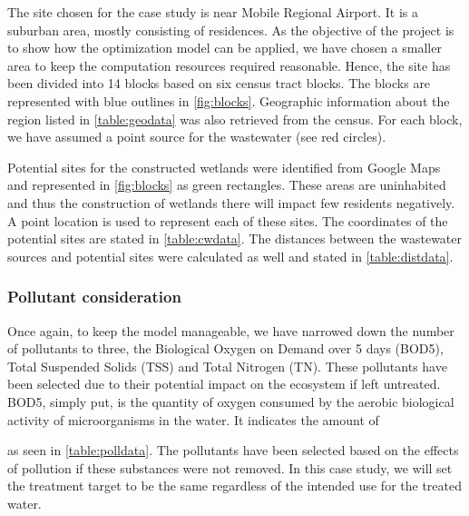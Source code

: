 \documentclass[preprint,12pt,authoryear]{elsarticle}
\begin{document}
The site chosen for the case study is near Mobile Regional Airport. It is a suburban area, mostly consisting of residences. As the objective of the project is to show how the optimization model can be applied, we have chosen a smaller area to keep the computation resources required reasonable. Hence, the site has been divided into 14 blocks based on six census tract blocks. The blocks are represented with blue outlines in \autoref{fig:blocks}. Geographic information about the region listed in \autoref{table:geodata} was also retrieved from the census. \citep{acs2015} For each block, we have assumed a point source for the wastewater (see red circles).

Potential sites for the constructed wetlands were identified from Google Maps and represented in \autoref{fig:blocks} as green rectangles. These areas are uninhabited and thus the construction of wetlands there will impact few residents negatively. A point location is used to represent each of these sites. The coordinates of the potential sites are stated in \autoref{table:cwdata}. The distances between the wastewater sources and potential sites were calculated as well and stated in \autoref{table:distdata}. 

\subsubsection{Pollutant consideration} 

Once again, to keep the model manageable, we have narrowed down the number of pollutants to three, the Biological Oxygen on Demand over 5 days (BOD5), Total Suspended Solids (TSS) and Total Nitrogen (TN). These pollutants have been selected due to their potential impact on the ecosystem if left untreated. BOD5, simply put, is the quantity of oxygen consumed by the aerobic biological activity of microorganisms in the water. It indicates the amount of 

 as seen in \autoref{table:polldata}. The pollutants have been selected based on the effects of pollution if these substances were not removed. In this case study, we will set the treatment target to be the same regardless of the intended use for the treated water.
\end{document}
